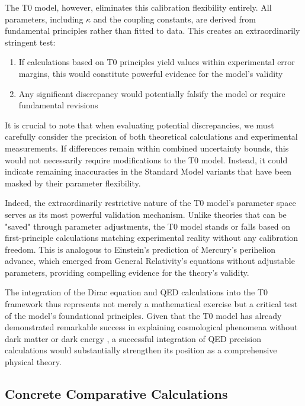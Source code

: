 \documentclass[12pt,a4paper]{article}
\begin{document}
	The T0 model, however, eliminates this calibration flexibility entirely. All parameters, including $\kappa$ and the coupling constants, are derived from fundamental principles rather than fitted to data. This creates an extraordinarily stringent test:
	
	\begin{enumerate}
		\item If calculations based on T0 principles yield values within experimental error margins, this would constitute powerful evidence for the model's validity
		\item Any significant discrepancy would potentially falsify the model or require fundamental revisions
	\end{enumerate}
	
	It is crucial to note that when evaluating potential discrepancies, we must carefully consider the precision of both theoretical calculations and experimental measurements. If differences remain within combined uncertainty bounds, this would not necessarily require modifications to the T0 model. Instead, it could indicate remaining inaccuracies in the Standard Model variants that have been masked by their parameter flexibility.
	
	Indeed, the extraordinarily restrictive nature of the T0 model's parameter space serves as its most powerful validation mechanism. Unlike theories that can be "saved" through parameter adjustments, the T0 model stands or falls based on first-principle calculations matching experimental reality without any calibration freedom. This is analogous to Einstein's prediction of Mercury's perihelion advance, which emerged from General Relativity's equations without adjustable parameters, providing compelling evidence for the theory's validity.
	
	The integration of the Dirac equation and QED calculations into the T0 framework thus represents not merely a mathematical exercise but a critical test of the model's foundational principles. Given that the T0 model has already demonstrated remarkable success in explaining cosmological phenomena without dark matter or dark energy \cite{pascher_emergente_2025}, a successful integration of QED precision calculations would substantially strengthen its position as a comprehensive physical theory.
	
	\subsection{Concrete Comparative Calculations}
	\label{subsec:comparative_calculations}
	
\end{document}
